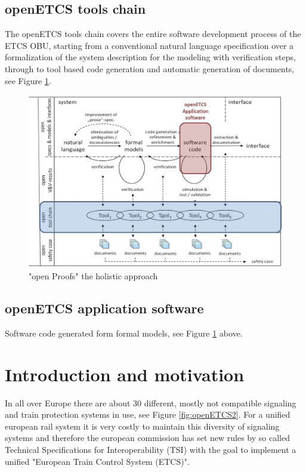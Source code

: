 \documentclass{template/openetcs_report}
\begin{document}
\section{openETCS tools chain}
The openETCS tools chain covers the entire software development process of the ETCS OBU,
starting from a conventional natural language specification over a formalization of the system
description for the modeling with verification steps, through to tool based code generation
and automatic generation of documents, see Figure \ref{fig:openETCS1}.

\begin{figure}
  \centering
  \includegraphics[width=16cm]{openETCS1}
  \caption{"open Proofs" the holistic approach}
  \label{fig:openETCS1}
\end{figure}



\section{openETCS application software}
Software code generated form formal models, see Figure \ref{fig:openETCS1} above.


\chapter{Introduction and motivation}
In all over Europe there are about 30 different, mostly not compatible signaling and train protection systems in use, see Figure \ref{fig:openETCS2}. For a unified european rail system it is very costly to maintain this diversity of signaling systems and therefore the european commission has set new rules by so called Technical Specifications for Interoperability (TSI) with the goal to implement a unified "European Train Control System (ETCS)".
\end{document}
